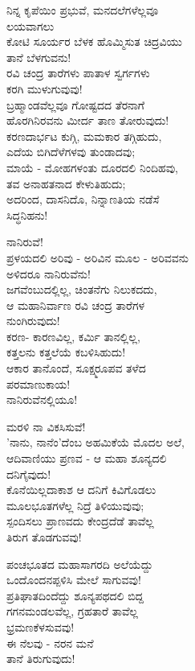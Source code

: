 ನಿನ್ನ ಕೃಪೆಯಿಂ ಪ್ರಭುವೆ, ಮನದಲೆಗಳೆಲ್ಲವೂ\\ಲಯವಾಗಲು\\ಕೋಟಿ ಸೂರ್ಯರ ಬೆಳಕ ಹೊಮ್ಮಿಸುತ ಚಿದ್ರವಿಯು\\ತಾನೆ ಬೆಳಗುವನು!\\ರವಿ ಚಂದ್ರ ತಾರೆಗಳು ಪಾತಾಳ ಸ್ವರ್ಗಗಳು\\ಕರಗಿ ಮುಳುಗುವುವು!\\ಬ್ರಹ್ಮಾಂಡವೆಲ್ಲವೂ ಗೋಷ್ಟದದ ತೆರನಾಗೆ\\ಹೊರಗಿನಿರವನು ಮೀರ್ದ ತಾಣ ತೋರುವುದು!\\
 ಕರಣದಾರ್ಭಟ ಕುಗ್ಗಿ, ಮಮಕಾರ ತಗ್ಗಿಹುದು,\\ಎದೆಯ ಬಿಗಿದೆಳೆಗಳವು ತುಂಡಾದವು;\\ಮಾಯೆ - ಮೋಹಗಳಂತು ದೂರದಲಿ ನಿಂದಿಹವು,\\ತವ ಅನಾಹತನಾದ ಕೇಳುತಿಹುದು;\\ಅದರಿಂದ, ದಾಸನಿದೊ, ನಿನ್ನಾಣತಿಯ ನಡೆಸೆ\\ಸಿದ್ಧನಿಹನು!

ನಾನಿರುವೆ!\\ಪ್ರಳಯದಲಿ ಅರಿವು - ಅರಿವಿನ ಮೂಲ - ಅರಿವವನು\\ಅಳಿದರೂ ನಾನಿರುವೆನು!\\ಜಗವೆಂಬುದಲ್ಲಿಲ್ಲ, ಚಿಂತನೆಗು ನಿಲುಕದದು,\\ಆ ಮಹಾನಿರ್ವಾಣ ರವಿ ಚಂದ್ರ ತಾರೆಗಳ\\ನುಂಗಿರುವುದು!\\ಕರಣ- ಕಾರಣವಿಲ್ಲ, ಕರ್ಮಿ ತಾನಲ್ಲಿಲ್ಲ,\\ಕತ್ತಲನು ಕತ್ತಲೆಯೆ ಕಬಳಿಸಿಹುದು!\\ಆಕಾರ ತಾನೊಂದೆ, ಸೂಕ್ಷ್ಮರೂಪವ ತಳೆದ\\ಪರಮಾಣುಕಾಯ!\\ನಾನಿರುವೆನಲ್ಲಿಯೂ!

ಮರಳಿ ನಾ ವಿಕಸಿಸುವೆ!\\'ನಾನು, ನಾನೆಂ'ದೆಂಬ ಅಹಮಿಕೆಯೆ ಮೊದಲ ಅಲೆ,\\ಆದಿವಾಣಿಯು ಪ್ರಣವ - ಆ ಮಹಾ ಶೂನ್ಯದಲಿ\\ದನಿಗೈವುದು!\\ಕೊನೆಯಿಲ್ಲದಾಕಾಶ ಆ ದನಿಗೆ ಕಿವಿಗೊಡಲು\\ಮೂಲಭೂತಗಳೆಲ್ಲ ನಿದ್ರೆ ತಿಳಿಯುವುವು;\\ಸ್ಪಂದಿಸಲು ಪ್ರಾಣವದು ಕೇಂದ್ರದೆಡೆ ತಾವೆಲ್ಲ\\ತಿರುಗ ತೊಡಗುವವು!

ಪಂಚಭೂತದ ಮಹಾಸಾಗರದಿ ಅಲೆಯೆದ್ದು\\ಒಂದೊಂದನಪ್ಪಳಿಸಿ ಮೇಲೆ ಸಾಗುವವು!\\ಪ್ರತಿಘಾತದಿಂದೆದ್ದು ಶೂನ್ಯಪಥದಲಿ ಬಿದ್ದ\\ಗಗನಮಂಡಲವೆಲ್ಲ, ಗ್ರಹತಾರೆ ತಾವೆಲ್ಲ\\ಭ್ರಮಣಕೆಳಸುವವು!\\ಈ ನೆಲವು - ನರನ ಮನೆ\\ತಾನೆ ತಿರುಗುವುದು!

